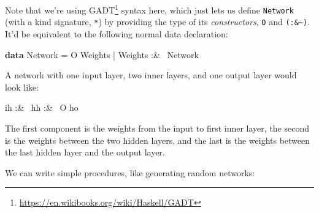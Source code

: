 \documentclass[]{article}
\newenvironment{Shaded}{}{}
\newcommand{\KeywordTok}[1]{\textcolor[rgb]{0.00,0.44,0.13}{\textbf{#1}}}
\newcommand{\DataTypeTok}[1]{\textcolor[rgb]{0.56,0.13,0.00}{#1}}
\newcommand{\FunctionTok}[1]{\textcolor[rgb]{0.02,0.16,0.49}{#1}}
\newcommand{\NormalTok}[1]{#1}
\renewcommand{\href}[2]{#2\footnote{\url{#1}}}
\begin{document}
Note that we're using \href{https://en.wikibooks.org/wiki/Haskell/GADT}{GADT}
syntax here, which just lets us define \texttt{Network} (with a kind signature,
\texttt{*}) by providing the type of its \emph{constructors}, \texttt{O} and
\texttt{(:\&\textasciitilde{})}. It'd be equivalent to the following normal data
declaration:

\begin{Shaded}
\begin{Highlighting}[]
\KeywordTok{data} \DataTypeTok{Network} \FunctionTok{=} \DataTypeTok{O} \DataTypeTok{Weights}
             \FunctionTok{|} \DataTypeTok{Weights} \FunctionTok{:&~} \DataTypeTok{Network}
\end{Highlighting}
\end{Shaded}

A network with one input layer, two inner layers, and one output layer would
look like:

\begin{Shaded}
\begin{Highlighting}[]
\NormalTok{ih }\FunctionTok{:&~}\NormalTok{ hh }\FunctionTok{:&~} \DataTypeTok{O}\NormalTok{ ho}
\end{Highlighting}
\end{Shaded}

The first component is the weights from the input to first inner layer, the
second is the weights between the two hidden layers, and the last is the weights
between the last hidden layer and the output layer.

We can write simple procedures, like generating random networks:
\end{document}
